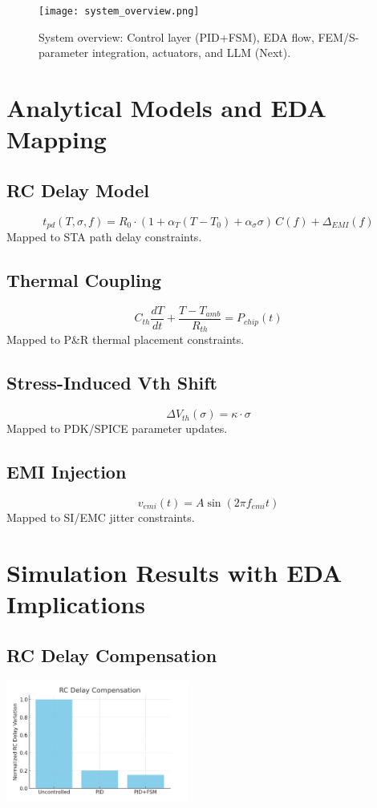 \documentclass[conference]{IEEEtran}
\begin{document}
\begin{figure}[h]
  \centering
  \texttt{[image: system\_overview.png]}
  \caption{System overview: Control layer (PID+FSM), EDA flow, FEM/S-parameter integration, actuators, and LLM (Next).}
\end{figure}

\section{Analytical Models and EDA Mapping}
\subsection{RC Delay Model}
\[
t_{pd}(T,\sigma,f) = R_0 \cdot (1+\alpha_T (T-T_0)+\alpha_\sigma \sigma)\,C(f)+\Delta_{EMI}(f)
\]
Mapped to STA path delay constraints.

\subsection{Thermal Coupling}
\[
C_{th}\frac{dT}{dt} + \frac{T-T_{amb}}{R_{th}} = P_{chip}(t)
\]
Mapped to P\&R thermal placement constraints.

\subsection{Stress-Induced Vth Shift}
\[
\Delta V_{th}(\sigma)=\kappa \cdot \sigma
\]
Mapped to PDK/SPICE parameter updates.

\subsection{EMI Injection}
\[
v_{emi}(t)=A\sin(2\pi f_{emi} t)
\]
Mapped to SI/EMC jitter constraints.

\section{Simulation Results with EDA Implications}
\subsection{RC Delay Compensation}
\includegraphics[width=0.45\textwidth]{sim_delay_rc.png}
\end{document}
